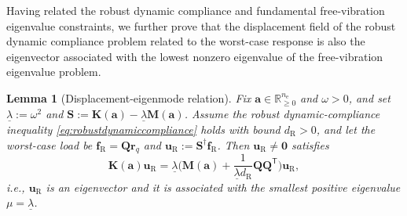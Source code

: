 \documentclass[preprint,3p]{elsarticle}
\newtheorem{lemma}{Lemma}
\newcommand{\T}{^{\mathsf T}}
\newcommand{\nel}{n_\mathrm{e}}
\newcommand{\R}{\mathrm{R}}
\numberwithin{equation}{section}
\begin{document}
Having related the robust dynamic compliance and fundamental free-vibration eigenvalue constraints, we further prove that the displacement field of the robust dynamic compliance problem related to the worst-case response is also the eigenvector associated with the lowest nonzero eigenvalue of the free-vibration eigenvalue problem.

\begin{lemma}[Displacement-eigenmode relation]\label{lemma:dyncomp_eigenvec}
Fix $\mathbf{a}\in\mathbb R_{\ge0}^{\nel}$ and $\omega>0$, and set $\underline{\lambda}:=\omega^2$ and
$\mathbf{S}:=\mathbf{K}(\mathbf{a})-\underline{\lambda}\mathbf{M}(\mathbf{a})$.
Assume the robust dynamic-compliance inequality \eqref{eq:robustdynamiccompliance} holds with bound $d_\R>0$,
and let the worst-case load be $\mathbf{f}_\R= \mathbf{Q} \mathbf{r}_{q}$ and
$\mathbf{u}_\R:=\mathbf{S}^\dagger\mathbf{f}_\R$.
Then $\mathbf{u}_\R\neq \mathbf{0}$ satisfies
\[
\mathbf{K}(\mathbf{a}) \mathbf{u}_\R
=\underline{\lambda}\Big(\mathbf{M}(\mathbf{a})+\frac{1}{\underline{\lambda} d_\R} \mathbf{Q}\mathbf{Q}\T\Big)\mathbf{u}_\R,
\]
i.e., $\mathbf{u}_\R$ is an eigenvector and it is associated with the smallest positive eigenvalue $\mu=\underline{\lambda}$.
\end{lemma}
\end{document}
